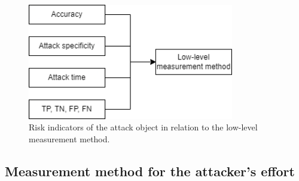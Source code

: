 \begin{figure}[ht!]
  \centering
  \includegraphics[width=9cm]{pictures/measure_damage.png}
  \caption{Risk indicators of the attack object in relation to the low-level measurement method.}
  \label{fig:measure_damage}
\end{figure}

\subsection*{Measurement method for the attacker's effort}
\label{sec:find_effort}


